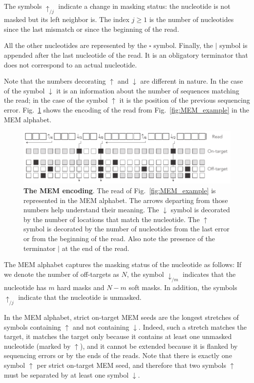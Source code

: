 \documentclass{article}
\begin{document}
The symbols $\uparrow_{/j}$ indicate a change in masking status: the
nucleotide is not masked but its left neighbor is. The index $j \geq 1$ is
the number of nucleotides since the last mismatch or since the beginning
of the read.

All the other nucleotides are represented by the $\square$ symbol.
Finally, the $|$ symbol is appended after the last nucleotide of the read.
It is an obligatory terminator that does not correspond to an actual
nucleotide.

Note that the numbers decorating $\uparrow$ and $\downarrow$ are different
in nature. In the case of the symbol $\downarrow$ it is an information
about the number of sequences matching the read; in the case of the symbol
$\uparrow$ it is the position of the previous sequencing error.
Fig.~\ref{fig:sketch_extended} shows the encoding of the read from
Fig.~\ref{fig:MEM_example} in the MEM alphabet.

\begin{figure}[h]
\centering
\includegraphics[scale=.85]{sketch_extended.pdf}
\caption{\textbf{The MEM encoding}.
The read of Fig.~\ref{fig:MEM_example} is represented in the MEM alphabet.
The arrows departing from those numbers help understand their meaning. The
$\downarrow$ symbol is decorated by the number of locations that match the
nucleotide. The $\uparrow$ symbol is decorated by the number of
nucleotides from the last error or from the beginning of the read. Also
note the presence of the terminator $|$ at the end of the read.}
\label{fig:sketch_extended}
\end{figure}

The MEM alphabet captures the masking status of the nucleotide as follows:
If we denote the number of off-targets as $N$, the symbol
$\downarrow_{/m}$ indicates that the nucleotide has $m$ hard masks and
$N-m$ soft masks. In addition, the symbols $\uparrow_{/j}$ indicate that
the nucleotide is unmasked.

In the MEM alphabet, strict on-target MEM seeds are the longest stretches
of symbols containing $\uparrow$ and not containing $\downarrow$. Indeed,
such a stretch matches the target, it matches the target only because it
contains at least one unmasked nucleotide (marked by $\uparrow$), and it
cannot be extended because it is flanked by sequencing errors or by the
ends of the reads. Note that there is exactly one symbol $\uparrow$ per
strict on-target MEM seed, and therefore that two symbols $\uparrow$ must
be separated by at least one symbol $\downarrow$.
\end{document}
